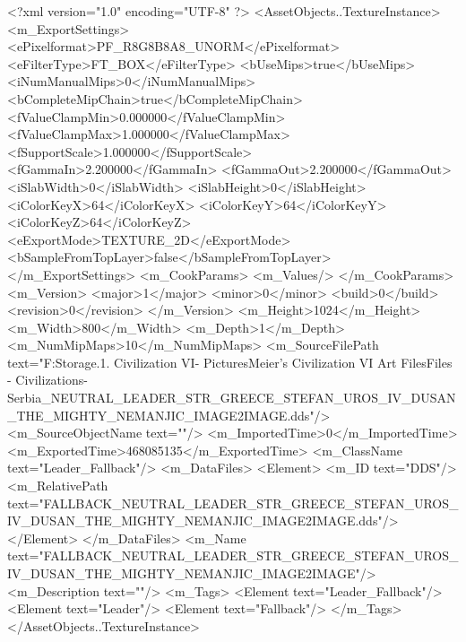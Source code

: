 <?xml version="1.0" encoding="UTF-8" ?>
<AssetObjects..TextureInstance>
	<m_ExportSettings>
		<ePixelformat>PF_R8G8B8A8_UNORM</ePixelformat>
		<eFilterType>FT_BOX</eFilterType>
		<bUseMips>true</bUseMips>
		<iNumManualMips>0</iNumManualMips>
		<bCompleteMipChain>true</bCompleteMipChain>
		<fValueClampMin>0.000000</fValueClampMin>
		<fValueClampMax>1.000000</fValueClampMax>
		<fSupportScale>1.000000</fSupportScale>
		<fGammaIn>2.200000</fGammaIn>
		<fGammaOut>2.200000</fGammaOut>
		<iSlabWidth>0</iSlabWidth>
		<iSlabHeight>0</iSlabHeight>
		<iColorKeyX>64</iColorKeyX>
		<iColorKeyY>64</iColorKeyY>
		<iColorKeyZ>64</iColorKeyZ>
		<eExportMode>TEXTURE_2D</eExportMode>
		<bSampleFromTopLayer>false</bSampleFromTopLayer>
	</m_ExportSettings>
	<m_CookParams>
		<m_Values/>
	</m_CookParams>
	<m_Version>
		<major>1</major>
		<minor>0</minor>
		<build>0</build>
		<revision>0</revision>
	</m_Version>
	<m_Height>1024</m_Height>
	<m_Width>800</m_Width>
	<m_Depth>1</m_Depth>
	<m_NumMipMaps>10</m_NumMipMaps>
	<m_SourceFilePath text="F:\Mod Storage\2.1. Civilization VI\Mods\Archive - Pictures\Sid Meier's Civilization VI Art Files\Art Files - Civilizations\Civilization - Serbia\FALLBACK_NEUTRAL_LEADER_STR_GREECE_STEFAN_UROS_IV_DUSAN_THE_MIGHTY_NEMANJIC_IMAGE2IMAGE.dds"/>
	<m_SourceObjectName text=""/>
	<m_ImportedTime>0</m_ImportedTime>
	<m_ExportedTime>468085135</m_ExportedTime>
	<m_ClassName text="Leader_Fallback"/>
	<m_DataFiles>
		<Element>
			<m_ID text="DDS"/>
			<m_RelativePath text="FALLBACK_NEUTRAL_LEADER_STR_GREECE_STEFAN_UROS_IV_DUSAN_THE_MIGHTY_NEMANJIC_IMAGE2IMAGE.dds"/>
		</Element>
	</m_DataFiles>
	<m_Name text="FALLBACK_NEUTRAL_LEADER_STR_GREECE_STEFAN_UROS_IV_DUSAN_THE_MIGHTY_NEMANJIC_IMAGE2IMAGE"/>
	<m_Description text=""/>
	<m_Tags>
		<Element text="Leader_Fallback"/>
		<Element text="Leader"/>
		<Element text="Fallback"/>
	</m_Tags>
</AssetObjects..TextureInstance>


